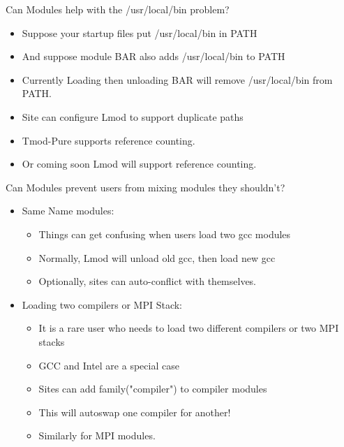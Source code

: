 \documentclass{beamer}
\begin{document}
\begin{frame}{Can Modules help with the /usr/local/bin problem?}
  \begin{itemize}
    \item Suppose your startup files put /usr/local/bin in PATH
    \item And suppose module BAR also adds /usr/local/bin to PATH
    \item Currently Loading then unloading BAR will remove
      /usr/local/bin from PATH. 
    \item Site can configure Lmod to support duplicate paths
    \item Tmod-Pure supports reference counting.
    \item Or coming soon Lmod will support reference counting.
  \end{itemize}
\end{frame}

\begin{frame}{Can Modules prevent users from mixing modules they shouldn't?}
  \begin{itemize}
      \item Same Name modules:
      \begin{itemize}
        \item Things can get confusing when users load two gcc modules
        \item Normally, Lmod will unload old gcc, then load new gcc
        \item Optionally, sites can auto-conflict with themselves.
      \end{itemize}
    \item Loading two compilers or MPI Stack:
      \begin{itemize}
        \item It is a rare user who needs to load two different
          compilers or two MPI stacks
        \item GCC and Intel are a special case
        \item Sites can add family("compiler") to compiler modules
        \item This will autoswap one compiler for another!
        \item Similarly for MPI modules.
      \end{itemize}
  \end{itemize}
\end{frame}
\end{document}
